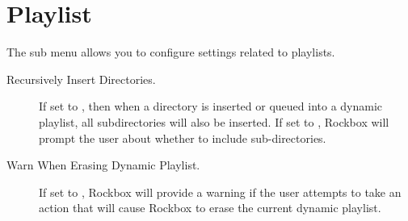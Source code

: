 \section{\label{ref:PlaylistOptions}Playlist}
The  sub menu allows you to configure settings
related to playlists.
\begin{description}
\item[Recursively Insert Directories. ]
  If set to , then when a directory is inserted or queued into a 
  dynamic playlist, all subdirectories will also be inserted. If set to ,
  Rockbox will prompt the user about whether to include sub-directories.

\item[Warn When Erasing Dynamic Playlist. ]
  If set to , Rockbox will provide a warning if the user attempts to
  take an action that will cause Rockbox to erase the current dynamic playlist.
\end{description}
